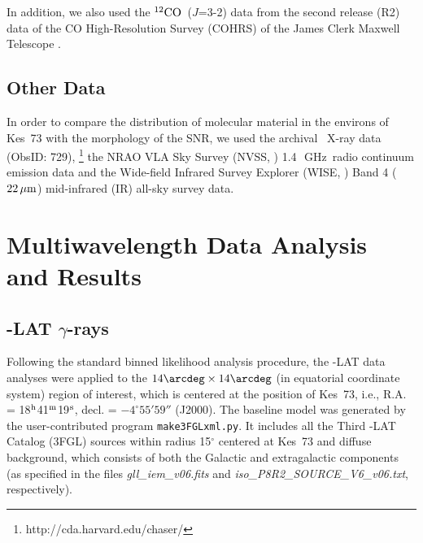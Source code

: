 \documentclass[12pt,preprint]{aastex}
\newcommand{\GHz}{\,{\rm GHz}}  \newcommand{\ks}{\,{\rm ksec}}
\newcommand{\um}{\,\mu{\rm m}}    \newcommand{\mm}{\,{\rm mm}}
\newcommand{\twCO}{$^{12}{\rm CO}$}
\newcommand{\Jttt}{$J$=3-2}
\newcommand{\gray}{{\rm $\gamma$-ray}}
\begin{document}
In addition, we also used the \twCO~(\Jttt) data from the second release (R2) data of  
the CO High-Resolution Survey (COHRS) of the James Clerk Maxwell Telescope 
 \citep{Dempsey2013}.


\subsection{Other Data}

In order to compare the distribution of molecular material in the environs of Kes~73
with the morphology of  the SNR, we used the archival \Chandra\ X-ray data (ObsID: 729),
\footnote{http://cda.harvard.edu/chaser/}
the NRAO VLA Sky Survey (NVSS, \citealt{nvss1998}) 
1.4~\GHz\ radio continuum emission data  and
the Wide-field Infrared Survey Explorer (WISE, \citealt{wise2010})  
Band 4 ($22\um$) mid-infrared (IR) all-sky survey data.



\section{Multiwavelength Data Analysis and Results}


\subsection{\Fermi-LAT $\gamma$-rays}
\label{sec:fermi}


 
Following the standard binned likelihood analysis procedure,
the \Fermi-LAT data analyses were applied to the
$14\arcdeg\times 14\arcdeg$ (in equatorial coordinate system) region of interest, 
which is centered at the position of Kes~73, i.e.,
R.A. = 18$^{\rm h}$41$^{\rm m}$19$^{\rm s}$, 
decl. = $-4^{\circ}55'59''$ (J2000).
The baseline model was generated by 
the user-contributed program {\tt make3FGLxml.py}.
It includes all the Third \Fermi-LAT Catalog (3FGL) sources \citep{3fgl} 
within radius 15$^\circ$ centered at Kes~73 and diffuse background, 
which consists of both the Galactic and extragalactic components 
(as specified in the files \emph{gll\_iem\_v06.fits} and
\emph{iso\_P8R2\_SOURCE\_V6\_v06.txt}, respectively).
\end{document}

